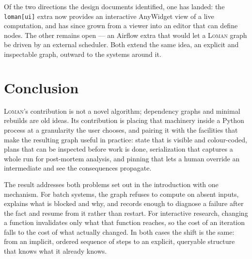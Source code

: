 \documentclass[11pt,a4paper]{article}
\newcommand{\loman}{\textsc{Loman}}
\newcommand{\code}[1]{\texttt{#1}}
\begin{document}
Of the two directions the design documents identified, one has landed: the
\code{loman[ui]} extra now provides an interactive AnyWidget view of a live
computation, and has since grown from a viewer into an editor that can define
nodes. The other remains open --- an Airflow extra that would let a \loman{}
graph be driven by an external scheduler. Both extend the same idea, an
explicit and inspectable graph, outward to the systems around it.

\section{Conclusion}\label{sec:conclusion}

\loman{}'s contribution is not a novel algorithm; dependency graphs and minimal
rebuilds are old ideas. Its contribution is placing that machinery inside a
Python process at a granularity the user chooses, and pairing it with the
facilities that make the resulting graph useful in practice: state that is
visible and colour-coded, plans that can be inspected before work is done,
serialization that captures a whole run for post-mortem analysis, and pinning
that lets a human override an intermediate and see the consequences propagate.

The result addresses both problems set out in the introduction with one
mechanism. For batch systems, the graph refuses to compute on absent inputs,
explains what is blocked and why, and records enough to diagnose a failure
after the fact and resume from it rather than restart. For interactive
research, changing a function invalidates only what that function reaches, so
the cost of an iteration falls to the cost of what actually changed. In both
cases the shift is the same: from an implicit, ordered sequence of steps to an
explicit, queryable structure that knows what it already knows.
\end{document}
